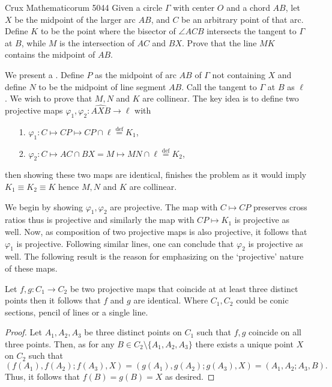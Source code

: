 \begin{problem}{15}{Crux Mathematicorum 5044} Given a circle $\Gamma$ with center $O$ and a chord $AB$, let $X$ be the midpoint of the larger arc $AB$, and $C$ be an arbitrary point of that arc. Define $K$ to be the point where the bisector of $\angle ACB$ intersects the tangent to $\Gamma$ at $B$, while $M$ is the intersection of $AC$ and $BX$. Prove that the line $MK$ contains the midpoint of $AB$.
	\begin{solution} We present a . Define $P$ as the midpoint of arc $AB$ of $\Gamma$ not containing $X$ and define $N$ to be the midpoint of line segment $AB$. Call the tangent to $\Gamma$ at $B$ as $\ell$. We wish to prove that $M, N$ and $K$ are collinear. The key idea is to define two projective maps $\varphi_1, \varphi_2 : \widehat{AXB} \to \ell$ with
	
	\begin{itemize}
		\item[{1.}] $\varphi_1 : C \mapsto CP \mapsto CP \cap \ell \overset{\text{def}}{=} K_1$, 
		\item[{2.}] $\varphi_2 : C \mapsto AC \cap BX = M \mapsto MN \cap \ell \overset{\text{def}}{=} K_2$,
	\end{itemize} 
	\noindent then showing these two maps are identical, finishes the problem as it would imply $K_1 \equiv K_2 \equiv K$ hence $M, N$ and $K$ are collinear.
	\par We begin by showing $\varphi_1, \varphi_2$ are projective. The map with $C \mapsto CP$ 
preserves cross ratios thus is projective and similarly the map with $CP \mapsto K_1$ 
is projective as well. Now, as composition of two projective maps is also projective, 
it follows that $\varphi_1$ is projective. Following similar lines, one can conclude 
that $\varphi_2$ is projective as well. The following result is the reason for 
emphasizing on the `projective' nature of these maps.
	
	\begin{lemma}{1} Let $f,g : C_1 \to C_2$ be two projective maps that coincide 
at at least three distinct points then it follows that $f$ and $g$ are identical. 
Where $C_1,C_2$ could be conic sections, pencil of lines or a single line.
	\end{lemma}
	\begin{proof} Let $A_1,A_2,A_3$ be three distinct points on $C_1$ such that 
$f,g$ coincide on all three points. Then, as for any $B \in C_2 \setminus \{A_1,A_2,A_3\}$ 
there exists a unique point $X$ on $C_2$ such that
\[
(f(A_1), f(A_2); f(A_3), X) = (g(A_1), g(A_2); g(A_3), X) = (A_1, A_2; A_3, B).
\]
	Thus, it follows that $f(B) = g(B) = X$ as desired.
	\end{proof}


\end{solution}
\end{problem}
